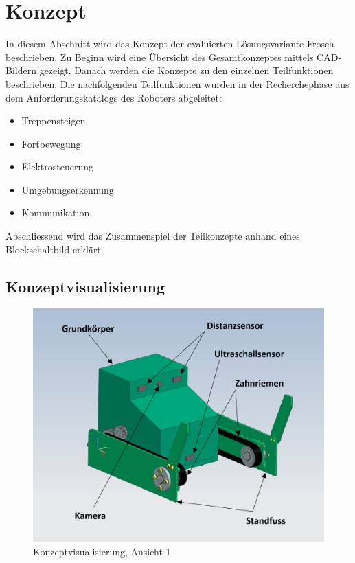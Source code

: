 \newpage

\section{Konzept}
In diesem Abschnitt wird das Konzept der evaluierten Lösungsvariante \glqq Frosch\grqq{} beschrieben. Zu Beginn wird eine Übersicht des Gesamtkonzeptes mittels CAD-Bildern gezeigt. Danach werden die Konzepte zu den einzelnen Teilfunktionen beschrieben. Die nachfolgenden Teilfunktionen wurden in der Recherchephase aus dem Anforderungskatalogs des Roboters abgeleitet:
\begin{itemize}
    \item Treppensteigen
    \item Fortbewegung
    \item Elektrosteuerung
    \item Umgebungserkennung
    \item Kommunikation
\end{itemize}
Abschliessend wird das Zusammenspiel der Teilkonzepte anhand eines Blockschaltbild erklärt.

\subsection{Konzeptvisualisierung}


\begin{figure}[H]
  \includegraphics[width=1\textwidth]{img/Treppensteigen/Geraetansicht_final.PNG}
  \centering
  \caption{Konzeptvisualisierung, Ansicht 1}
  \label{fig:konzeptvisualisierung-ansicht1}
\end{figure}

